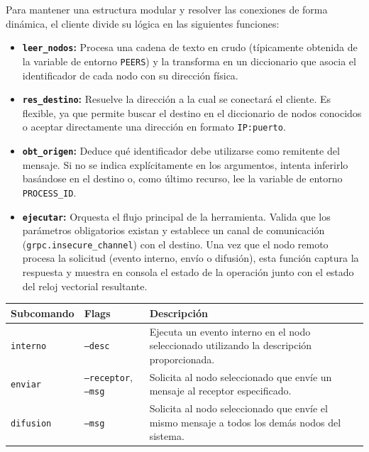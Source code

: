 \documentclass[letterpaper,11pt]{article}
\begin{document}
Para mantener una estructura modular y resolver las conexiones de forma dinámica, 
el cliente divide su lógica en las siguientes funciones:

\begin{itemize}
    \item \textbf{\texttt{leer\_nodos}:} Procesa una cadena de texto en crudo 
    (típicamente obtenida de la variable de entorno \texttt{PEERS}) y 
    la transforma en un diccionario que asocia el identificador de 
    cada nodo con su dirección física.
    \item \textbf{\texttt{res\_destino}:} Resuelve la dirección a 
    la cual se conectará el cliente. Es flexible, ya que permite 
    buscar el destino en el diccionario de nodos conocidos o aceptar
     directamente una dirección en formato \texttt{IP:puerto}.
    \item \textbf{\texttt{obt\_origen}:} Deduce qué identificador 
    debe utilizarse como remitente del mensaje. Si no se indica
     explícitamente en los argumentos, intenta inferirlo basándose 
     en el destino o, como último recurso, lee la variable de entorno 
     \texttt{PROCESS\_ID}.
    \item \textbf{\texttt{ejecutar}:} Orquesta el flujo principal de 
    la herramienta. Valida que los parámetros obligatorios existan y 
    establece un canal de comunicación (\texttt{grpc.insecure\_channel}) 
    con el destino. Una vez que el nodo remoto procesa la solicitud
     (evento interno, envío o difusión), esta función captura la respuesta y
      muestra en consola el estado de la operación junto con el estado del 
      reloj vectorial resultante.
\end{itemize}

\begin{center}
\begin{tabular}{>{\ttfamily}l l p{7.5cm}}
\toprule
\textbf{Subcomando} & \textbf{Flags} & \textbf{Descripción} \\
\midrule
\texttt{interno}  & \texttt{--desc} &
  Ejecuta un evento interno en el nodo seleccionado utilizando la
  descripción proporcionada. \\[4pt]

\texttt{enviar}   & \texttt{--receptor}, \texttt{--msg} &
  Solicita al nodo seleccionado que envíe un mensaje al receptor
  especificado. \\[4pt]

\texttt{difusion} & \texttt{--msg} &
  Solicita al nodo seleccionado que envíe el mismo mensaje a todos los
  demás nodos del sistema. \\
\bottomrule
\end{tabular}
\end{center}
\end{document}
